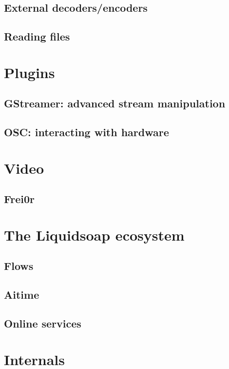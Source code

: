 \documentclass{book}
\begin{document}
\section{External decoders/encoders}

\section{Reading files}

\chapter{Plugins}
\section{GStreamer: advanced stream manipulation}

\section{OSC: interacting with hardware}

\chapter{Video}

\section{Frei0r}

\chapter{The Liquidsoap ecosystem}
\section{Flows}

\section{Aitime}

\section{Online services}

\chapter{Internals}
\end{document}
